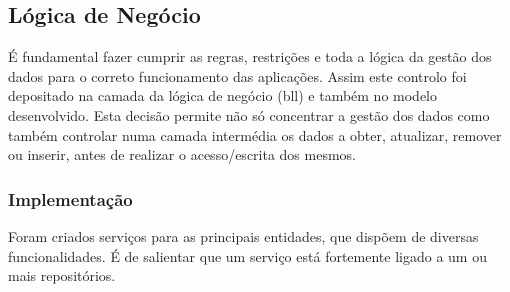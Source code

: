 %
%
\subsection{Lógica de Negócio}\label{subsec454}

É fundamental fazer cumprir as regras, restrições e toda a lógica da gestão dos dados para o correto funcionamento das aplicações. Assim  este controlo foi depositado na camada da lógica de negócio (\acrshort{bll}) e também no modelo desenvolvido. Esta decisão permite não só concentrar a gestão dos dados como também controlar numa camada intermédia os dados a obter, atualizar, remover ou inserir, antes de realizar o acesso/escrita dos mesmos. 

\subsubsection{Implementação}\label{subsubsec4541}
 
 Foram criados serviços para as principais entidades, que dispõem de diversas funcionalidades. É de salientar que um serviço está fortemente ligado a um ou mais repositórios. 